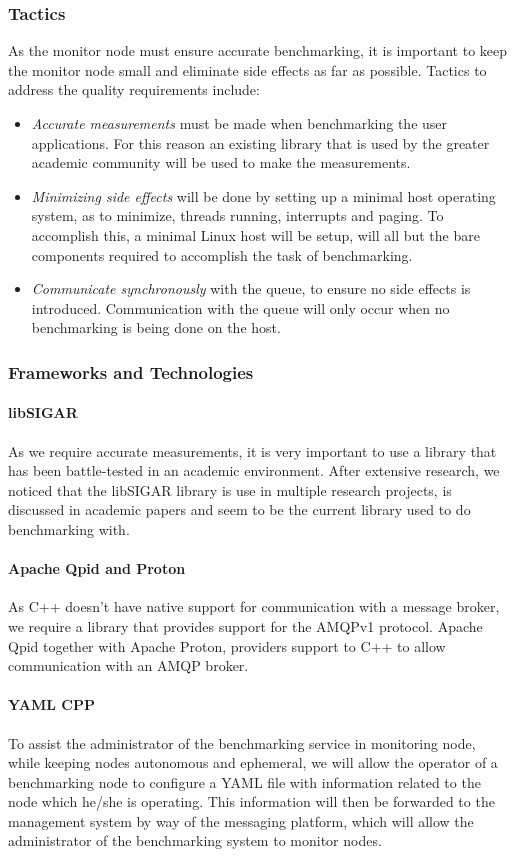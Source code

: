 \subsubsection{Tactics}
As the monitor node must ensure accurate benchmarking, it is important to keep
the monitor node small and eliminate side effects as far as possible. Tactics
to  address the quality requirements include:
\begin{itemize}
	\item \textit{Accurate measurements} must be made when benchmarking the user
    applications. For this reason an existing library that is used by the greater
    academic community will be used to make the measurements.
	\item \textit{Minimizing side effects} will be done by setting up a minimal
    host operating system, as to minimize, threads running, interrupts and
    paging. To accomplish this, a minimal Linux host will be setup, will all but
    the bare components required to accomplish the task of benchmarking.
	\item \textit{Communicate synchronously} with the queue, to ensure no side
    effects is introduced. Communication with the queue will only occur when
    no benchmarking is being done on the host.
\end{itemize}

\subsubsection{Frameworks and Technologies}
\paragraph*{libSIGAR} As we require accurate measurements, it is very important
  to use a library that has been battle-tested in an academic environment. After
  extensive research, we noticed that the libSIGAR library is use in multiple
  research projects, is discussed in academic papers and seem to be the current
  library used to do benchmarking with.
\paragraph*{Apache Qpid and Proton} As C++ doesn't have native support for 
  communication with a message broker, we require a library that provides support
  for the AMQPv1 protocol. Apache Qpid together with Apache Proton, providers
  support to C++ to allow communication with an AMQP broker.
\paragraph*{YAML CPP} To assist the administrator of the benchmarking service
  in monitoring node, while keeping nodes autonomous and ephemeral, we will allow
  the operator of a benchmarking node to configure a YAML file with information
  related to the node which he/she is operating. This information will then be
  forwarded to the management system by way of the messaging platform, which
  will allow the administrator of the benchmarking system to monitor nodes.
